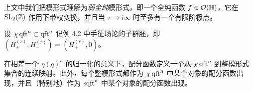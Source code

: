 \begin{remark}[4.12]
上文中我们把模形式理解为\emph{弱全纯}模形式，即一个全纯函数 $f\in\mathcal{O}(\mathbb{H})$，它在 $\mathrm{SL}_2(\mathbb{Z})$ 作用下带权变换，并且当 $\tau\to i\infty$ 时至多有一个有限阶极点。
\end{remark}

设 $\chi\operatorname{qft}^n\subset\operatorname{qft}^n$ 记例 4.2 中手征场论的子群胚，即 $(H^{(r)}_+,H^{(r)}_-)=(H^{(r)}_+,0)$。

\begin{corollary}[4.13（{[ST11, Theorem 1.15]}）]
在相差一个 $\eta(q)^n$ 的归一化的意义下，配分函数定义一个从 $\chi\operatorname{qft}^n$ 到整模形式集合的连续映射。此外，每个整模形式都作为 $\chi\operatorname{qft}^n$ 中某个对象的配分函数出现，并且（特别地）作为 $\operatorname{sqft}^n$ 中某个对象的配分函数出现。
\end{corollary}

